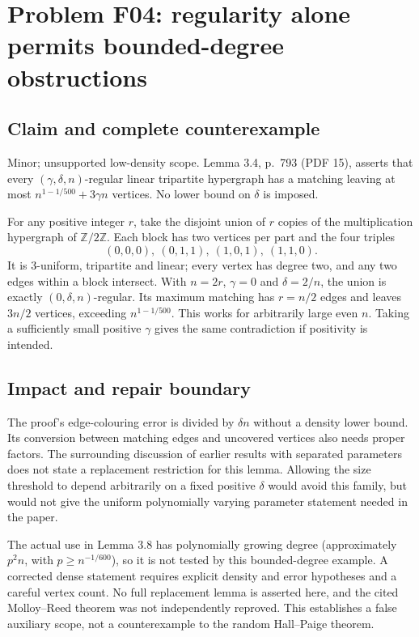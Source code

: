 \documentclass[10pt]{article}
\begin{document}
\section*{Problem F04: regularity alone permits bounded-degree obstructions}
\subsection*{Claim and complete counterexample}
Minor; unsupported low-density scope. Lemma 3.4, p. 793 (PDF 15), asserts that every \((\gamma,\delta,n)\)-regular linear tripartite hypergraph has a matching leaving at most \(n^{1-1/500}+3\gamma n\) vertices. No lower bound on \(\delta\) is imposed.\par
For any positive integer \(r\), take the disjoint union of \(r\) copies of the multiplication hypergraph of \(\mathbb Z/2\mathbb Z\). Each block has two vertices per part and the four triples \[(0,0,0),\ (0,1,1),\ (1,0,1),\ (1,1,0).\] It is 3-uniform, tripartite and linear; every vertex has degree two, and any two edges within a block intersect. With \(n=2r\), \(\gamma=0\) and \(\delta=2/n\), the union is exactly \((0,\delta,n)\)-regular. Its maximum matching has \(r=n/2\) edges and leaves \(3n/2\) vertices, exceeding \(n^{1-1/500}\). This works for arbitrarily large even \(n\). Taking a sufficiently small positive \(\gamma\) gives the same contradiction if positivity is intended.\par
\subsection*{Impact and repair boundary}
The proof’s edge-colouring error is divided by \(\delta n\) without a density lower bound. Its conversion between matching edges and uncovered vertices also needs proper factors. The surrounding discussion of earlier results with separated parameters does not state a replacement restriction for this lemma. Allowing the size threshold to depend arbitrarily on a fixed positive \(\delta\) would avoid this family, but would not give the uniform polynomially varying parameter statement needed in the paper.\par
The actual use in Lemma 3.8 has polynomially growing degree (approximately \(p^2n\), with \(p\geq n^{-1/600}\)), so it is not tested by this bounded-degree example. A corrected dense statement requires explicit density and error hypotheses and a careful vertex count. No full replacement lemma is asserted here, and the cited Molloy–Reed theorem was not independently reproved. This establishes a false auxiliary scope, not a counterexample to the random Hall–Paige theorem.\par
\end{document}
